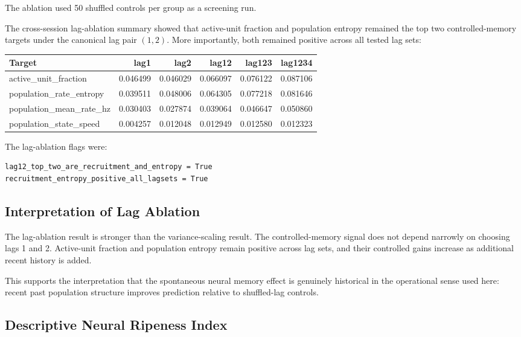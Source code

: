 The ablation used 50 shuffled controls per group as a screening run.

The cross-session lag-ablation summary showed that active-unit fraction and population entropy remained the top two controlled-memory targets under the canonical lag pair \((1,2)\). More importantly, both remained positive across all tested lag sets:

\begin{center}
\begin{tabular}{lrrrrr}
\hline
Target & lag1 & lag2 & lag12 & lag123 & lag1234 \\
\hline
active\_unit\_fraction & 0.046499 & 0.046029 & 0.066097 & 0.076122 & 0.087106 \\
population\_rate\_entropy & 0.039511 & 0.048006 & 0.064305 & 0.077218 & 0.081646 \\
population\_mean\_rate\_hz & 0.030403 & 0.027874 & 0.039064 & 0.046647 & 0.050860 \\
population\_state\_speed & 0.004257 & 0.012048 & 0.012949 & 0.012580 & 0.012323 \\
\hline
\end{tabular}
\end{center}

The lag-ablation flags were:

\begin{verbatim}
lag12_top_two_are_recruitment_and_entropy = True
recruitment_entropy_positive_all_lagsets = True
\end{verbatim}

\subsection{Interpretation of Lag Ablation}

The lag-ablation result is stronger than the variance-scaling result. The controlled-memory signal does not depend narrowly on choosing lags 1 and 2. Active-unit fraction and population entropy remain positive across lag sets, and their controlled gains increase as additional recent history is added.

This supports the interpretation that the spontaneous neural memory effect is genuinely historical in the operational sense used here: recent past population structure improves prediction relative to shuffled-lag controls.

\subsection{Descriptive Neural Ripeness Index}

